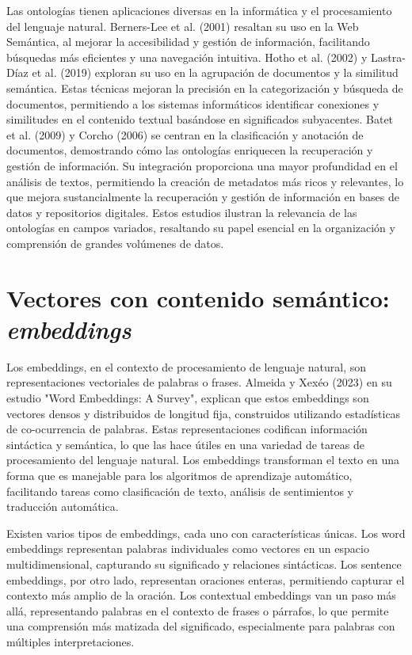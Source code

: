 Las ontologías tienen aplicaciones diversas en la informática y el procesamiento del lenguaje natural. Berners-Lee et al. (2001) resaltan su uso en la Web Semántica, al mejorar la accesibilidad y gestión de información, facilitando búsquedas más eficientes y una navegación intuitiva. Hotho et al. (2002) y Lastra-Díaz et al. (2019) exploran su uso en la agrupación de documentos y la similitud semántica. Estas técnicas mejoran la precisión en la categorización y búsqueda de documentos, permitiendo a los sistemas informáticos identificar conexiones y similitudes en el contenido textual basándose en significados subyacentes. Batet et al. (2009) y Corcho (2006) se centran en la clasificación y anotación de documentos, demostrando cómo las ontologías enriquecen la recuperación y gestión de información. Su integración proporciona una mayor profundidad en el análisis de textos, permitiendo la creación de metadatos más ricos y relevantes, lo que mejora sustancialmente la recuperación y gestión de información en bases de datos y repositorios digitales.
Estos estudios ilustran la relevancia de las ontologías en campos variados, resaltando su papel esencial en la organización y comprensión de grandes volúmenes de datos.

\section{Vectores con contenido sem\'antico: \textit{embeddings}}

Los embeddings, en el contexto de procesamiento de lenguaje natural, son representaciones vectoriales de palabras o frases. Almeida y Xexéo (2023) en su estudio "Word Embeddings: A Survey", explican que estos embeddings son vectores densos y distribuidos de longitud fija, construidos utilizando estadísticas de co-ocurrencia de palabras. Estas representaciones codifican información sintáctica y semántica, lo que las hace útiles en una variedad de tareas de procesamiento del lenguaje natural. Los embeddings transforman el texto en una forma que es manejable para los algoritmos de aprendizaje automático, facilitando tareas como clasificación de texto, análisis de sentimientos y traducción automática.

Existen varios tipos de embeddings, cada uno con características únicas. Los word embeddings representan palabras individuales como vectores en un espacio multidimensional, capturando su significado y relaciones sintácticas. Los sentence embeddings, por otro lado, representan oraciones enteras, permitiendo capturar el contexto más amplio de la oración. Los contextual embeddings van un paso más allá, representando palabras en el contexto de frases o párrafos, lo que permite una comprensión más matizada del significado, especialmente para palabras con múltiples interpretaciones.

